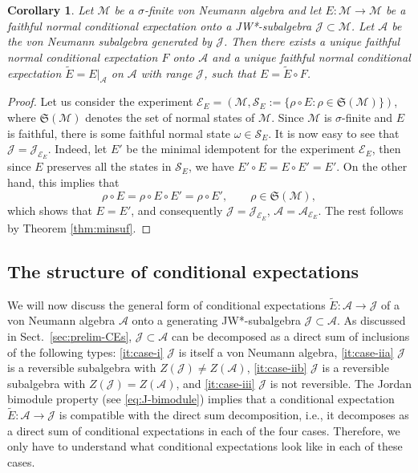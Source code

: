 \documentclass[12pt]{article}
\def\states{\mathfrak S}
\def\Me{\mathcal M}
\def\Ee{\mathcal E}
\def\Je{\mathcal J}
\def\Ae{\mathcal A}
\def\Se{\mathcal S}
\newtheorem{coro}{Corollary}
\theoremstyle{definition}
\theoremstyle{remark}
\begin{document}
\begin{coro}\label{coro:positive_projections} Let $\Me$ be a $\sigma$-finite von Neumann algebra and let
$E:\Me\to \Me$ be a faithful normal conditional expectation onto a JW*-subalgebra $\Je\subset \Me$.
Let $\Ae$ be the von Neumann subalgebra generated by $\Je$. Then there
exists a unique faithful normal conditional expectation $F$ onto  $\Ae$ 
and a unique faithful normal conditional expectation $\tilde E =E |_{\Ae}$ on $\Ae$ with range
$\Je$, such that $E=\tilde E\circ F$.
\end{coro}


\begin{proof} Let us consider the experiment $\Ee_E=(\Me,\Se_E:=\{\rho\circ E: \rho\in
\states(\Me)\})$, where $\states(\Me)$ denotes the set of normal states of $\Me$.  Since $\Me$ is $\sigma$-finite and $E$ is faithful, there is some
faithful normal state $\omega\in \Se_E$. It is now easy to see that $\Je=\Je_{\Ee_E}$.
Indeed, let $E'$ be the minimal idempotent for the experiment $\Ee_E$, then since $E$
preserves all the states in $\Se_E$, we have $E'\circ E=E\circ E'=E'$. On the other hand,
this implies that 
 \[
\rho\circ E=\rho\circ E\circ E'=\rho\circ E',\qquad \rho\in \states(\Me),
 \]
which shows that $E=E'$, and consequently $\Je=\Je_{\Ee_E}$, $\Ae=\Ae_{\Ee_E}$. 
The rest follows by Theorem \ref{thm:minsuf}.

\end{proof}


\subsection{The structure of conditional expectations} \label{sec:structure}



We will now discuss the general form of conditional expectations $\tilde E:\Ae \to \Je$ of a von Neumann algebra $\Ae$ onto a generating JW*-subalgebra $\Je\subset \Ae$.
As discussed in Sect.~\ref{sec:prelim-CEs}, $\Je \subset \Ae$ can be decomposed as a direct sum of inclusions of the following types: \ref{it:case-i} $\Je$ is itself a von Neumann algebra, \ref{it:case-iia} $\Je$ is a reversible subalgebra with $Z(\Je)\ne Z(\Ae)$, \ref{it:case-iib} $\Je$ is a reversible subalgebra with $Z(\Je)=Z(\Ae)$, and \ref{it:case-iii} $\Je$ is not reversible.
The Jordan bimodule property (see \eqref{eq:J-bimodule}) implies that a conditional expectation $\tilde E:\Ae \to \Je$ is compatible with the direct sum decomposition, i.e., it decomposes as a direct sum of conditional expectations in each of the four cases.
Therefore, we only have to understand what conditional expectations look like in each of these cases.
\end{document}
